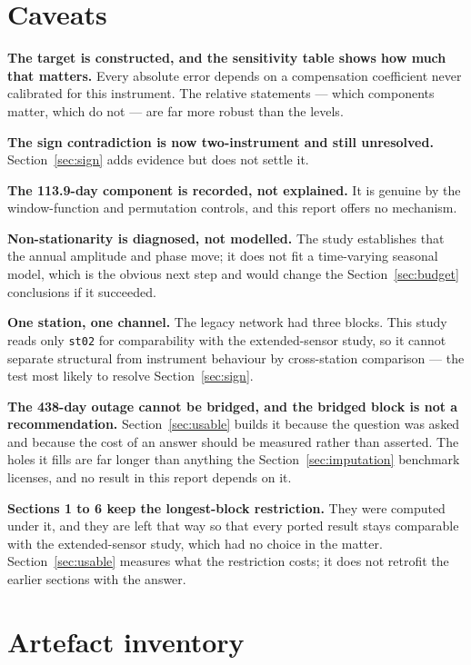 \documentclass[11pt,a4paper]{article}
\begin{document}
\section{Caveats}

\textbf{The target is constructed, and the sensitivity table shows how much that
matters.} Every absolute error depends on a compensation coefficient never
calibrated for this instrument. The relative statements --- which components
matter, which do not --- are far more robust than the levels.

\textbf{The sign contradiction is now two-instrument and still unresolved.}
Section~\ref{sec:sign} adds evidence but does not settle it.

\textbf{The 113.9-day component is recorded, not explained.} It is genuine by the
window-function and permutation controls, and this report offers no mechanism.

\textbf{Non-stationarity is diagnosed, not modelled.} The study establishes that
the annual amplitude and phase move; it does not fit a time-varying seasonal
model, which is the obvious next step and would change the
Section~\ref{sec:budget} conclusions if it succeeded.

\textbf{One station, one channel.} The legacy network had three blocks. This
study reads only \texttt{st02} for comparability with the extended-sensor study,
so it cannot separate structural from instrument behaviour by cross-station
comparison --- the test most likely to resolve Section~\ref{sec:sign}.

\textbf{The 438-day outage cannot be bridged, and the bridged block is not a
recommendation.} Section~\ref{sec:usable} builds it because the question was
asked and because the cost of an answer should be measured rather than asserted.
The holes it fills are far longer than anything the Section~\ref{sec:imputation}
benchmark licenses, and no result in this report depends on it.

\textbf{Sections 1 to 6 keep the longest-block restriction.} They were computed
under it, and they are left that way so that every ported result stays comparable
with the extended-sensor study, which had no choice in the matter.
Section~\ref{sec:usable} measures what the restriction costs; it does not
retrofit the earlier sections with the answer.

\section{Artefact inventory}
\end{document}
